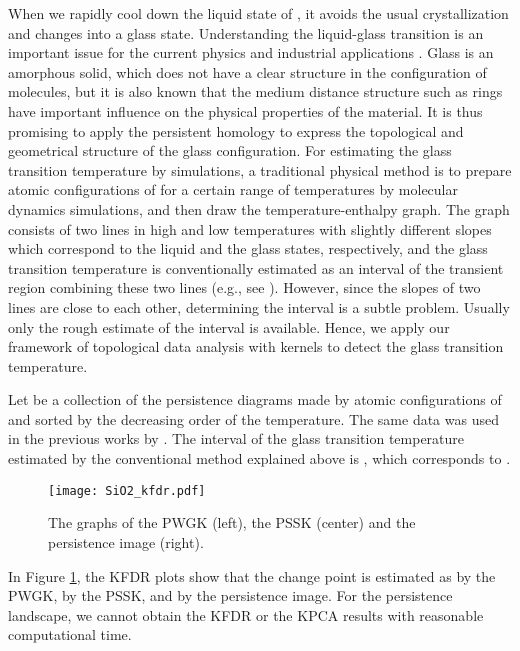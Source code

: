 \documentclass{article}
\begin{document}
When we rapidly cool down the liquid state of , it avoids the usual crystallization and changes into a glass state. 
Understanding the liquid-glass transition is an important issue for the current physics and industrial applications \cite{GS07}.
Glass is an amorphous solid, which does not have a clear structure in the configuration of molecules, but it is also known that the medium distance structure such as rings have important influence on the physical properties of the material.
It is thus promising to apply the persistent homology to express the topological and geometrical structure of the glass configuration.
For estimating the glass transition temperature by simulations, a traditional physical method is to prepare atomic configurations of  for a certain range of temperatures by molecular dynamics simulations, and then draw the temperature-enthalpy graph. 
The graph consists of two lines in high and low temperatures with slightly different slopes which correspond to the liquid and the glass states, respectively, and the glass transition temperature is conventionally estimated as an interval of the transient region combining these two lines
 (e.g., see \cite{El90}).
However, since the slopes of two lines are close to each other, determining the interval is a subtle problem.
Usually only the rough estimate of the interval is available. Hence, we apply our framework of topological data analysis with kernels to detect the glass transition temperature. 

Let  be a collection of the persistence diagrams made by atomic configurations of  and sorted by the decreasing order of the temperature. The same data was used in the previous works by \cite{HNHEMN16,NHHEN15}. The interval of the glass transition temperature  estimated by the conventional method explained above is , which corresponds to . 

\begin{figure}[htbp]
\begin{center}
\texttt{[image: SiO2\_kfdr.pdf]}
\end{center}
\vspace{-3mm}
\caption{The  graphs of the PWGK (left), the PSSK (center) and the persistence image (right).}
\label{fig:glass_KFDR}
\end{figure}
In Figure \ref{fig:glass_KFDR}, the KFDR plots show that the change point is estimated as  by the PWGK,  by the PSSK, and    by the persistence image. For the persistence landscape, we cannot obtain the KFDR or the KPCA results with reasonable computational time.
\end{document}
